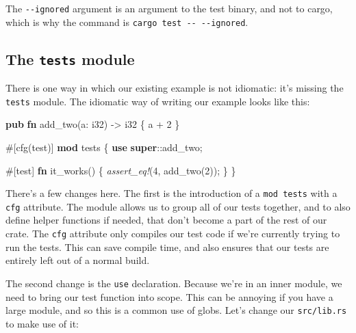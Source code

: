 \documentclass[a4paper,]{book}
\newenvironment{Shaded}{\begin{snugshade}}{\end{snugshade}}
\newcommand{\KeywordTok}[1]{\textcolor[rgb]{0.13,0.29,0.53}{\textbf{{#1}}}}
\newcommand{\DataTypeTok}[1]{\textcolor[rgb]{0.13,0.29,0.53}{{#1}}}
\newcommand{\DecValTok}[1]{\textcolor[rgb]{0.00,0.00,0.81}{{#1}}}
\newcommand{\PreprocessorTok}[1]{\textcolor[rgb]{0.56,0.35,0.01}{\textit{{#1}}}}
\newcommand{\AttributeTok}[1]{\textcolor[rgb]{0.77,0.63,0.00}{{#1}}}
\newcommand{\NormalTok}[1]{{#1}}
\begin{document}
The \texttt{-\/-ignored} argument is an argument to the test binary, and
not to cargo, which is why the command is
\texttt{cargo\ test\ -\/-\ -\/-ignored}.

\subsection{\texorpdfstring{The \texttt{tests}
module}{The tests module}}\label{the-tests-module}

There is one way in which our existing example is not idiomatic: it's
missing the \texttt{tests} module. The idiomatic way of writing our
example looks like this:

\begin{Shaded}
\begin{Highlighting}[]
\KeywordTok{pub} \KeywordTok{fn} \NormalTok{add_two(a: }\DataTypeTok{i32}\NormalTok{) -> }\DataTypeTok{i32} \NormalTok{\{}
    \NormalTok{a + }\DecValTok{2}
\NormalTok{\}}

\AttributeTok{#[}\NormalTok{cfg}\AttributeTok{(}\NormalTok{test}\AttributeTok{)]}
\KeywordTok{mod} \NormalTok{tests \{}
    \KeywordTok{use} \KeywordTok{super}\NormalTok{::add_two;}

    \AttributeTok{#[}\NormalTok{test}\AttributeTok{]}
    \KeywordTok{fn} \NormalTok{it_works() \{}
        \PreprocessorTok{assert_eq!}\NormalTok{(}\DecValTok{4}\NormalTok{, add_two(}\DecValTok{2}\NormalTok{));}
    \NormalTok{\}}
\NormalTok{\}}
\end{Highlighting}
\end{Shaded}

There's a few changes here. The first is the introduction of a
\texttt{mod\ tests} with a \texttt{cfg} attribute. The module allows us
to group all of our tests together, and to also define helper functions
if needed, that don't become a part of the rest of our crate. The
\texttt{cfg} attribute only compiles our test code if we're currently
trying to run the tests. This can save compile time, and also ensures
that our tests are entirely left out of a normal build.

The second change is the \texttt{use} declaration. Because we're in an
inner module, we need to bring our test function into scope. This can be
annoying if you have a large module, and so this is a common use of
globs. Let's change our \texttt{src/lib.rs} to make use of it:
\end{document}
